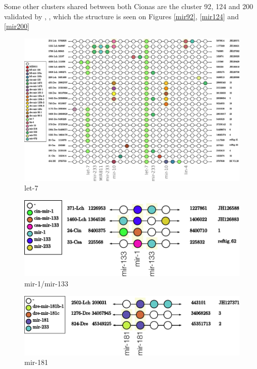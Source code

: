 \documentclass[graybox]{svmult}
\begin{document}
Some other clusters shared between both Cionas are the cluster 92, 124 and 200  
validated by \cite{Norden-Krichmar2007}, \cite{Fu2008}, \cite{Hendrix2010} which 
the structure is seen on Figures \ref{mir92}, \ref{mir124} and \ref{mir200}    


\begin{figure}[ht!]
\sidecaption[t]
\includegraphics[width=\textwidth]{./Images/Cluster_images/let-7_101_128}
\caption{let-7}
\label{fig:let-7}
\end{figure}

\begin{figure}[ht!]
\sidecaption[t]
\includegraphics[width=\textwidth]{./Images/Cluster_images/mir-133_113_33}
\caption{mir-1/mir-133}
\label{fig:mir-1}
\end{figure}

\begin{figure}[ht!]
\sidecaption[t]
\includegraphics[width=\textwidth]{./Images/Cluster_images/mir-181_105_2502}
\caption{mir-181}
\label{fig:mir-1}
\end{figure}
\end{document}
